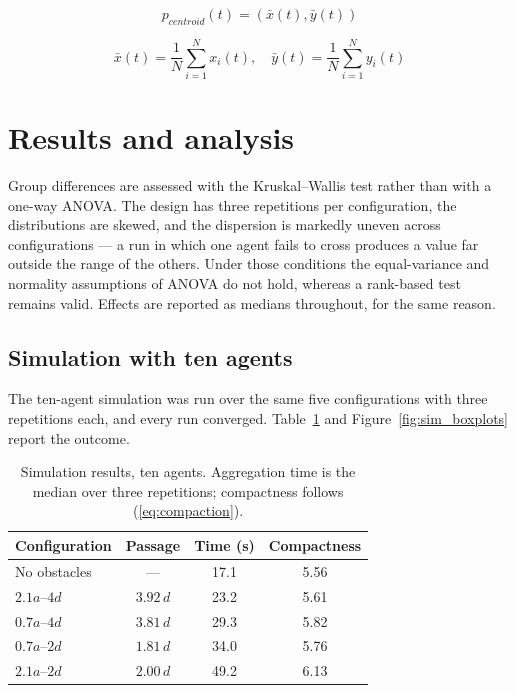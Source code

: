 \documentclass[conference]{IEEEtran}
\begin{document}
\begin{equation}
    p_{centroid}(t)= (\bar{x}(t), \bar{y}(t)) 
    \label{eq:centroid}
\end{equation}

\begin{equation}
    \bar{x}(t) = \frac{1}{N}\sum_{i=1}^N x_i(t), \quad \bar{y}(t) = \frac{1}{N}\sum_{i=1}^N y_i(t)
    \label{eq:avg_xy}
\end{equation}


\section{Results and analysis}

Group differences are assessed with the Kruskal--Wallis test rather than with a
one-way ANOVA. The design has three repetitions per configuration, the
distributions are skewed, and the dispersion is markedly uneven across
configurations --- a run in which one agent fails to cross produces a value far
outside the range of the others. Under those conditions the equal-variance and
normality assumptions of ANOVA do not hold, whereas a rank-based test remains
valid. Effects are reported as medians throughout, for the same reason.

\subsection{Simulation with ten agents}

The ten-agent simulation was run over the same five configurations with three
repetitions each, and every run converged. Table~\ref{tab:sim} and
Figure~\ref{fig:sim_boxplots} report the outcome.

\begin{table}[htbp]
\caption{Simulation results, ten agents. Aggregation time is the median over
three repetitions; compactness follows (\ref{eq:compaction}).}
\label{tab:sim}
\centering
\begin{tabular}{lccc}
\hline
\textbf{Configuration} & \textbf{Passage} & \textbf{Time (s)} & \textbf{Compactness} \\
\hline
No obstacles   & ---            & 17.1 & 5.56 \\
$2.1a$--$4d$   & $3.92\,d$      & 23.2 & 5.61 \\
$0.7a$--$4d$   & $3.81\,d$      & 29.3 & 5.82 \\
$0.7a$--$2d$   & $1.81\,d$      & 34.0 & 5.76 \\
$2.1a$--$2d$   & $2.00\,d$      & 49.2 & 6.13 \\
\hline
\end{tabular}
\end{table}
\end{document}
